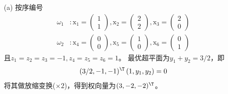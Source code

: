 \documentclass[reportComp]{thesis}
\begin{document}
\begin{answer}
\begin{itemize}
	\item [(a)] 按序编号
	\[\begin{aligned}
	\omega_{1}&: \mathrm{x}_{1}=\left(\begin{array}{c}{1} \\ {1}\end{array}\right), \mathrm{x}_{2}=\left(\begin{array}{l}{2} \\ {2}\end{array}\right), \mathrm{x}_{3}=\left(\begin{array}{l}{2} \\ {0}\end{array}\right)\\
	\omega_{2}&:\mathrm{x}_{4}=\left(\begin{array}{l}{0} \\ {0}\end{array}\right), \mathrm{x}_{5}=\left(\begin{array}{l}{1} \\ {0}\end{array}\right), \mathrm{x}_{6}=\left(\begin{array}{l}{0} \\ {1}\end{array}\right)
	\end{aligned}\]
	且$z_1=z_2=z_3=-1,z_4=z_5=z_6=1$。
	最优超平面为$y_1+y_2=3/2$，即
	\[(3 / 2,-1,-1)^\T \left(1,y_{1},y_{2}\right)=0\]
	将其做放缩变换($\times 2$)，得到权向量为$(3,-2,-2)^\T $。


\end{itemize}
\end{answer}
\end{document}
